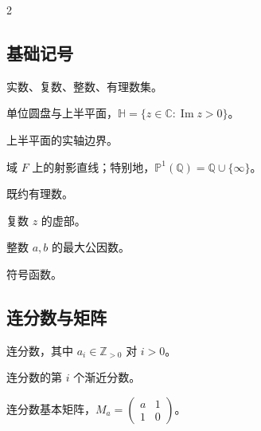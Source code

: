 \documentclass[10pt,UTF8]{ctexart}
\theoremstyle{definition}
\theoremstyle{remark}
\begin{document}
\begingroup
\small
\setlength{\columnsep}{2em}
\begin{multicols}{2}

\subsection*{基础记号}
\begin{description}[leftmargin=2.8cm, labelwidth=2.5cm, style=nextline]

\item[\(\mathbb R,\mathbb C,\mathbb Z,\mathbb Q\)]
实数、复数、整数、有理数集。

\item[\(\mathbb D,\mathbb H\)]
单位圆盘与上半平面，\(\mathbb H=\{z\in\mathbb C:\operatorname{Im}z>0\}\)。

\item[\(\partial\mathbb H\)]
上半平面的实轴边界。

\item[\(\mathbb P^1(F)\)]
域 \(F\) 上的射影直线；特别地，\(\mathbb P^1(\mathbb Q)=\mathbb Q\cup\{\infty\}\)。

\item[\(a/b\)]
既约有理数。

\item[\(\operatorname{Im}(z)\)]
复数 \(z\) 的虚部。

\item[\(\gcd(a,b)\)]
整数 \(a,b\) 的最大公因数。

\item[\(\operatorname{sgn}(x)\)]
符号函数。

\end{description}

\subsection*{连分数与矩阵}
\begin{description}[leftmargin=2.8cm, labelwidth=2.5cm, style=nextline]

\item[$a_0;a_1,\ldots,a_n$]
连分数，其中 \(a_i\in\mathbb {Z}_{>0}\) 对 \(i>0\)。

\item[\(x_i=p_i/q_i\)]
连分数的第 \(i\) 个渐近分数。

\item[\(M_a\)]
连分数基本矩阵，\(M_a=\begin{pmatrix}a&1\\1&0\end{pmatrix}\)。


\end{description}
\end{multicols}
\end{document}
